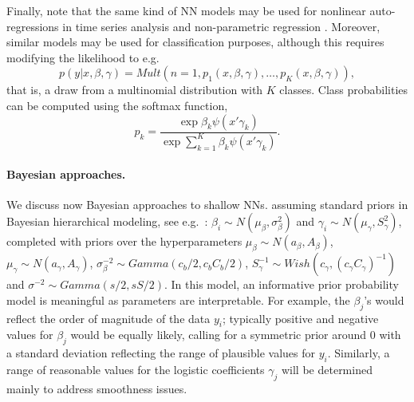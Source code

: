 Finally, note that the same kind of NN models 
may be used for nonlinear auto-regressions in
time series analysis \parencite{menchero} and 
non-parametric 
regression \parencite{insuamuller}. Moreover,
similar models may be used for classification purposes,
although this 
 requires modifying the likelihood
\parencite{bishop} to e.g.\
\begin{equation}
    p(y | x, \beta, \gamma) = Mult(n=1, 
    p_1 (x, \beta, \gamma) , \ldots, p_K (x, \beta, \gamma) ),
\end{equation}
that is, a draw from a multinomial distribution with $K$ classes. 
Class probabilities
 can be computed using the softmax function,
$$
p_k = \frac{\exp{\beta_k \psi(x'\gamma_k)}}{\exp{\sum_{k=1}^K \beta_k \psi(x'\gamma_k)}}.
$$


\paragraph{Bayesian approaches.}\label{bayeshallow}
We discuss now Bayesian approaches to shallow NNs.
assuming standard priors 
in Bayesian hierarchical modeling, see e.g.\ \parencite{LavineWest}: 
$  \beta_i      \sim  N(\mu_\beta,\sigma_\beta^2)$
and 
  $\gamma_i     \sim  N(\mu_\gamma,S_\gamma^2)$,
  completed with priors over the hyperparameters
$\mu_\beta \sim N(a_\beta,A_\beta)$,
$\mu_\gamma \sim N(a_\gamma,A_\gamma)$,
$\sigma^{-2}_\beta \sim Gamma(c_b/2,c_bC_b/2)$,
$S_\gamma^{-1} \sim Wish(c_\gamma,(c_\gamma C_\gamma)^{-1})$ and
$\sigma^{-2} \sim Gamma(s/2, sS/2)$.
In this model, 
an informative prior probability model
is meaningful as parameters are interpretable. For example, the $\beta_ j$’s would reflect the
order of magnitude of the data $y_i$; typically positive and negative values for
$\beta _j$ would be equally likely, calling for a symmetric prior around 
0 with
a standard deviation reflecting the range of plausible values for $y_i$. Similarly,
a range of reasonable values for the logistic coefficients $\gamma_ j$ will be determined
mainly to address smoothness
issues.

